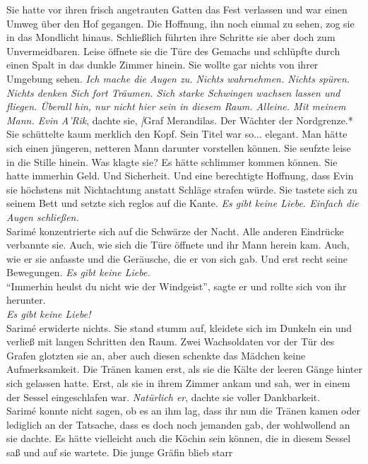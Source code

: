 Sie hatte vor ihren frisch angetrauten Gatten das Fest verlassen und war einen Umweg über den Hof 
gegangen. Die Hoffnung, ihn noch einmal zu sehen, zog sie in das Mondlicht hinaus. Schließlich 
führten ihre Schritte sie aber doch zum Unvermeidbaren. Leise öffnete sie die Türe des Gemachs und 
schlüpfte durch einen Spalt in das dunkle Zimmer hinein. Sie wollte gar nichts von ihrer Umgebung 
sehen. \textit{Ich mache die Augen zu. Nichts wahrnehmen. Nichts spüren. Nichts denken Sich fort 
Träumen. Sich starke Schwingen wachsen lassen und fliegen. Überall hin, nur nicht hier sein in 
diesem Raum. Alleine. Mit meinem Mann. Evin A'Rik}, dachte sie, \textit[{Graf Merandilas. Der 
Wächter der Nordgrenze.*}\\
Sie schüttelte kaum merklich den Kopf. Sein Titel war so... elegant. Man hätte sich einen jüngeren, 
netteren Mann darunter vorstellen können. Sie seufzte leise in die Stille hinein. Was klagte sie? 
Es hätte schlimmer kommen können. Sie hatte immerhin Geld. Und Sicherheit. Und eine berechtigte 
Hoffnung, dass Evin sie höchstens mit Nichtachtung anstatt Schläge strafen würde. Sie tastete sich 
zu seinem Bett und setzte sich reglos auf die Kante. \textit{Es gibt keine Liebe. Einfach die Augen 
schließen.}\\
Sarimé konzentrierte sich auf die Schwärze der Nacht. Alle anderen Eindrücke verbannte sie. Auch, 
wie sich die Türe öffnete und ihr Mann herein kam. Auch, wie er sie anfasste und die Geräusche, die 
er von sich gab. Und erst recht seine Bewegungen. \textit{Es gibt keine Liebe.}\\
``Immerhin heulst du nicht wie der Windgeist'', sagte er und rollte sich von ihr herunter.\\
\textit{Es gibt keine Liebe!}\\
Sarimé erwiderte nichts. Sie stand stumm auf, kleidete sich im Dunkeln ein und verließ mit langen 
Schritten den Raum. Zwei Wachsoldaten vor der Tür des Grafen glotzten sie an, aber auch diesen 
schenkte das Mädchen keine Aufmerksamkeit. Die Tränen kamen erst, als sie die Kälte der leeren 
Gänge hinter sich gelassen hatte. Erst, als sie in ihrem Zimmer ankam und sah, wer in einem der 
Sessel eingeschlafen war. \textit{Natürlich er}, dachte sie voller Dankbarkeit.\\
Sarimé konnte nicht sagen, ob es an ihm lag, dass ihr nun die Tränen kamen oder lediglich an der 
Tatsache, dass es doch noch jemanden gab, der wohlwollend an sie dachte. Es hätte vielleicht auch 
die Köchin sein können, die in diesem Sessel saß und auf sie wartete. Die junge Gräfin blieb starr 
